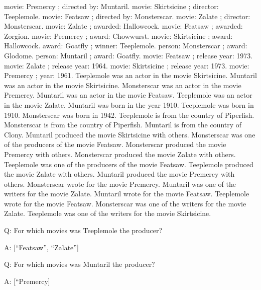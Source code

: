 \documentclass[
]{article}
\begin{document}
movie: Premercy ; directed by: Muntaril. movie: Skirtsicine ; director:
Teeplemole. movie: Featsaw ; directed by: Monsterscar. movie: Zalate ;
director: Monsterscar. movie: Zalate ; awarded: Hallowcock. movie:
Featsaw ; awarded: Zorgion. movie: Premercy ; award: Chowwurst. movie:
Skirtsicine ; award: Hallowcock. award: Goatfly ; winner: Teeplemole.
person: Monsterscar ; award: Glodome. person: Muntaril ; award: Goatfly.
movie: Featsaw ; release year: 1973. movie: Zalate ; release year: 1964.
movie: Skirtsicine ; release year: 1973. movie: Premercy ; year: 1961.
Teeplemole was an actor in the movie Skirtsicine. Muntaril was an actor
in the movie Skirtsicine. Monsterscar was an actor in the movie
Premercy. Muntaril was an actor in the movie Featsaw. Teeplemole was an
actor in the movie Zalate. Muntaril was born in the year 1910.
Teeplemole was born in 1910. Monsterscar was born in 1942. Teeplemole is
from the country of Piperfish. Monsterscar is from the country of
Piperfish. Muntaril is from the country of Clony. Muntaril produced the
movie Skirtsicine with others. Monsterscar was one of the producers of
the movie Featsaw. Monsterscar produced the movie Premercy with others.
Monsterscar produced the movie Zalate with others. Teeplemole was one of
the producers of the movie Featsaw. Teeplemole produced the movie Zalate
with others. Muntaril produced the movie Premercy with others.
Monsterscar wrote for the movie Premercy. Muntaril was one of the
writers for the movie Zalate. Muntaril wrote for the movie Featsaw.
Teeplemole wrote for the movie Featsaw. Monsterscar was one of the
writers for the movie Zalate. Teeplemole was one of the writers for the
movie Skirtsicine.

Q: For which movies was Teeplemole the producer?

A: {[}``Featsaw'', ``Zalate''{]}

Q: For which movies was Muntaril the producer?

A: {[}``Premercy{]}
\end{document}
